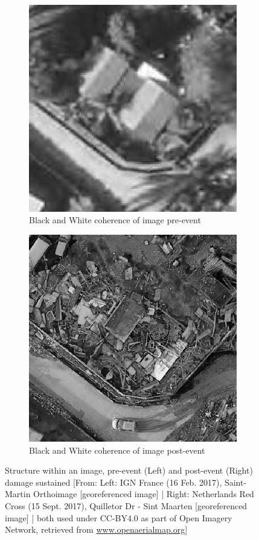 \begin{figure}[!h]
	\centering
	\begin{subfigure}{.475\textwidth}
	\centering
	\captionsetup{width=.85\linewidth}
	\includegraphics[width=.85\linewidth]{figs/CohBbw.png}
	\caption{\footnotesize{Black and White coherence of image pre-event}}
	\end{subfigure}
	\begin{subfigure}{.475\textwidth}
	\centering
	\captionsetup{width=.85\linewidth}
	\includegraphics[width=.85\linewidth]{figs/CohAbw.png}
	\caption{\footnotesize{Black and White coherence of image post-event}}
	\end{subfigure}
	\caption{\footnotesize{Structure within an image, pre-event (Left) and post-event (Right) damage sustained [From: Left: IGN France (16 Feb. 2017), Saint-Martin Orthoimage [georeferenced image] | Right: Netherlands Red Cross (15 Sept. 2017), Quilletor Dr - Sint Maarten [georeferenced image] | both used under CC-BY4.0 as part of Open Imagery Network, retrieved from \url{www.openaerialmap.org}]}}
	\label{fig:coh}
\end{figure}

